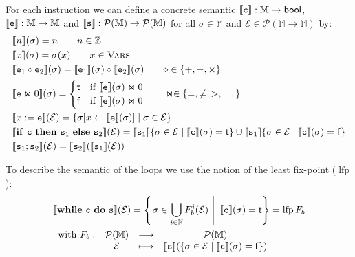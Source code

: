 \documentclass{llncs}
\newcommand\srule{\mathtt{s}}
\newcommand{\erule}{\mathtt{e}}
\newcommand{\crule}{\mathtt{c}}
\newcommand{\ifinst}{\mathbf{if}}
\newcommand{\theninst}{\mathbf{then}}
\newcommand{\elseinst}{\mathbf{else}}
\newcommand{\whileinst}{\mathbf{while}}
\newcommand{\doinst}{\mathbf{do}}
\newcommand{\bool}{\mathsf{bool}}
\newcommand{\True}{\mathsf{t}}
\newcommand{\False}{\mathsf{f}}
\newcommand{\Integer}{\mathbb Z}
\newcommand{\Memory}{\mathbb{M}}
\DeclareMathOperator{\lfp}{lfp}
\begin{document}
For each instruction we can define a concrete semantic $\exec{\crule} : \Memory \rightarrow \bool$, $\exec{\erule} : \Memory \rightarrow \Memory$ and $\exec{\srule} : \mathcal{P}(\Memory) \rightarrow \mathcal{P}(\Memory)$ for all $\sigma\in \Memory$ and $\mathcal E \in \mathcal{P}(\Memory \rightarrow \Memory)$ by:
\begin{align*}
	& \exec{n}(\sigma) = n \qquad n \in\Integer \\
	& \exec{x}(\sigma) = \sigma(x) \qquad x\in \vars\\
	& \exec{\erule_1 \diamond \erule_2}(\sigma) = \exec{\erule_1}(\sigma) \diamond \exec{\erule_2}(\sigma) \qquad \diamond \in \{+, -, \times\} \\
	& \exec{\erule \Join 0}(\sigma) = \begin{cases}
		\True & \text {if } \exec{\erule}(\sigma) \Join 0 \\
		\False & \text{if } \exec{\erule}(\sigma) \Join 0 
	\end{cases} \qquad \Join\in\{=, \neq, >, \dots\} \\
	& \exec{x := \erule}(\mathcal E) = \{\sigma[x \leftarrow \exec{\erule}(\sigma)] \mid \sigma\in\mathcal{E}\}\\
	& \exec{\ifinst\ \crule\ \theninst \ {\srule_1} \ \elseinst \ {\srule_2}}(\mathcal E) = \exec{\srule_1}\{\sigma \in \mathcal{E} \mid \exec{\crule}(\sigma) = \True\} \cup \exec{\srule_1}\{\sigma \in \mathcal{E} \mid \exec{\crule}(\sigma) = \False\} \\
	& \exec{\srule_1 ; \srule_2}(\mathcal E) = \exec{\srule_2}(\exec{\srule_1}(\mathcal E))
\end{align*}

To describe the semantic of the loops we use the notion of the least fix-point ($\lfp$):
	\begin{align*}
	&\exec{\whileinst \ \crule \ \doinst \ {\srule}}(\mathcal E) = \left\{ \left. \sigma \in \bigcup_{i \in \mathbb N} F_b^i(\mathcal{E}) \ \right| \ \exec{\crule}(\sigma) = \True\right\} = \lfp F_b\\
	&\begin{array}{cccc}
    \text{with } F_b: & \mathcal{P}(\Memory) & \longrightarrow & \mathcal{P}(\Memory)  \\ 
     & \mathcal E & \longmapsto & \exec{\srule} (\{ \sigma \in \mathcal{E} \mid  \exec{\crule}(\sigma) = \False \} )
    \end{array} 
\end{align*}
\end{document}
